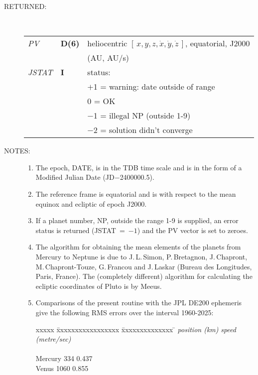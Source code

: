 \documentclass[11pt,twoside]{article}
\newcommand{\xyzxyzd}   {$[\,x,y,z,\dot{x},\dot{y},\dot{z}\,]$}
\newlength{\oldspacing}
\newcommand{\args}[2]
{
  \goodbreak
  \setlength{\oldspacing}{\topsep}
  \setlength{\topsep}{0.3ex}
  \begin{description}
  \item[#1]:\\[1.5ex]
    \begin{tabular}{p{7em}p{6em}p{22em}}
      #2
    \end{tabular}
  \end{description}
  \setlength{\topsep}{\oldspacing}
}
\renewcommand{\args}[2]
   {
     \begin{description}
        \item[#1:]\\
        \begin{tabular}{p{7em}p{6em}l}
           #2
        \end{tabular}
     \end{description}
   }
\newcommand{\spec}[3]
{
  {\em {#1}} & {\bf \mbox{#2}} & {#3}
}
\newcommand{\notes}[1]
{
  \goodbreak
  \setlength{\oldspacing}{\topsep}
  \setlength{\topsep}{0.3ex}
  \begin{description}
    \item[NOTES]:
        #1
  \end{description}
  \setlength{\topsep}{\oldspacing}
}
\renewcommand{\notes}[1]
   {
      \begin{description}
         \item[NOTES:]
            #1
      \end{description}
   }
\begin{document}
\args{RETURNED}
{
 \spec{PV}{D(6)}{heliocentric \xyzxyzd, equatorial, J2000} \\
 \spec{}{}{\hspace{1.5em} (AU, AU/s)} \\
 \spec{JSTAT}{I}{status:} \\
 \spec{}{}{\hspace{1.5em} $+$1 = warning: date outside of range} \\
 \spec{}{}{\hspace{2.3em}    0 = OK} \\
 \spec{}{}{\hspace{1.5em} $-$1 = illegal NP (outside 1-9)} \\
 \spec{}{}{\hspace{1.5em} $-$2 = solution didn't converge}
}
\notes
{
 \begin{enumerate}
  \item The epoch, DATE, is in the TDB time scale and is in the form
        of a Modified Julian Date (JD$-$2400000.5).
  \item The reference frame is equatorial and is with respect to
        the mean equinox and ecliptic of epoch J2000.
  \item If a planet number, NP, outside the range 1-9 is supplied, an error
        status is returned (JSTAT~=~$-1$) and the PV vector
        is set to zeroes.
  \item The algorithm for obtaining the mean elements of the
        planets from Mercury to Neptune is due to
        J.\,L.\,Simon, P.\,Bretagnon, J.\,Chapront,
        M.\,Chapront-Touze, G.\,Francou and J.\,Laskar (Bureau des
        Longitudes, Paris, France).  The (completely different)
        algorithm for calculating the ecliptic coordinates of
        Pluto is by Meeus.
  \item Comparisons of the present routine with the JPL DE200 ephemeris
        give the following RMS errors over the interval 1960-2025:
        \begin{tabbing}
         xxxxx \= xxxxxxxxxxxxxxxxx \= xxxxxxxxxxxxxx \= \kill
         \> \> {\it position (km)} \> {\it speed (metre/sec)} \\ \\
         \> Mercury \> \hspace{2em}334 \> \hspace{2.5em}0.437 \\
         \> Venus   \> \hspace{1.5em}1060 \> \hspace{2.5em}0.855 \\

\end{tabbing}
\end{enumerate}}
\end{document}

